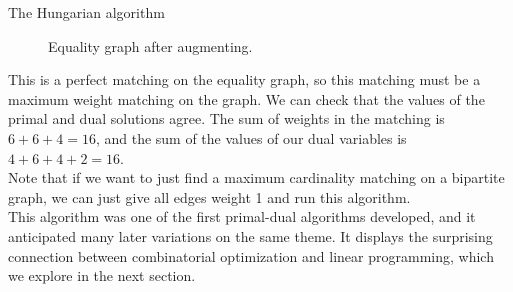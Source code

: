 \documentclass[11pt]{article}
\renewcommand{\'}{^{'}}
\begin{document}
\begin{section}{The Hungarian algorithm}
\begin{figure}[H]
		\caption{Equality graph after augmenting.}
	\end{figure}
	This is a perfect matching on the equality graph, so this matching must be a maximum weight 
	matching on the graph. We can check that the values of the primal and dual solutions agree. 
	The sum of weights in the matching is $6+6+4 = 16$, and the sum of the values of our 
	dual variables is $4+6+4+2 = 16$.\\
	Note that if we want to just find a maximum cardinality matching on a bipartite graph, 
	we can just give all edges weight 1 and run this algorithm.\\
	This algorithm was one of the first primal-dual algorithms developed, and it anticipated many 
	later variations on the same theme. It displays the surprising connection between combinatorial 
	optimization and linear programming, which we explore in the next section.
\end{section}
\end{document}
